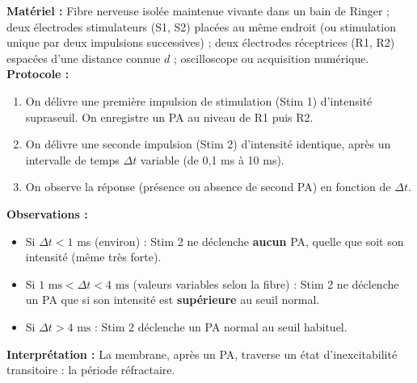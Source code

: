 \documentclass[11pt]{article}
\newcommand{\cle}[1]{{\popxbold\color{popdark}#1}}
\begin{document}
\begin{experience}
\textbf{Matériel :} Fibre nerveuse isolée maintenue vivante dans un bain de Ringer ; deux électrodes stimulateurs (S1, S2) placées au même endroit (ou stimulation unique par deux impulsions successives) ; deux électrodes réceptrices (R1, R2) espacées d'une distance connue $d$ ; oscilloscope ou acquisition numérique.
\textbf{Protocole :}
\begin{enumerate}
    \item On délivre une première impulsion de stimulation (Stim 1) d'intensité supraseuil. On enregistre un PA au niveau de R1 puis R2.
    \item On délivre une seconde impulsion (Stim 2) d'intensité identique, après un intervalle de temps $\Delta t$ variable (de 0,1 ms à 10 ms).
    \item On observe la réponse (présence ou absence de second PA) en fonction de $\Delta t$.
\end{enumerate}
\textbf{Observations :}
\begin{itemize}
    \item Si $\Delta t < 1$ ms (environ) : Stim 2 ne déclenche \textbf{aucun} PA, quelle que soit son intensité (même très forte).
    \item Si $1 \text{ ms} < \Delta t < 4 \text{ ms}$ (valeurs variables selon la fibre) : Stim 2 ne déclenche un PA que si son intensité est \textbf{supérieure} au seuil normal.
    \item Si $\Delta t > 4 \text{ ms}$ : Stim 2 déclenche un PA normal au seuil habituel.
\end{itemize}
\textbf{Interprétation :} La membrane, après un PA, traverse un état d'inexcitabilité transitoire : la \cle{période réfractaire}.
\end{experience}
\end{document}
